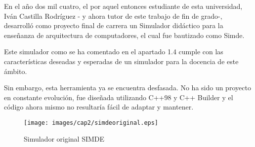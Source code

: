 En el año dos mil cuatro, el por aquel entonces estudiante de esta universidad, 
Iván Castilla Rodríguez - y ahora tutor de este trabajo de fin de grado-, 
desarrolló como proyecto final de carrera un Simulador didáctico para la enseñanza 
de arquitectura de computadores, el cual fue bautizado como Simde. \cite{SIMDE}

\bigskip
Este simulador como se ha comentado en el apartado 1.4 cumple con las características
deseadas y esperadas de un simulador para la docencia de este ámbito.

\bigskip
Sin embargo, esta herramienta ya se encuentra desfasada. No ha sido un proyecto en constante
evolución, fue diseñada utilizando C++98 y C++ Builder y el código ahora mismo no resultaría
fácil de adaptar y mantener.

\begin{figure}[!th]
\begin{center}
\texttt{[image: images/cap2/simdeoriginal.eps]}
\caption{Simulador original SIMDE}
\label{fig:Simulador original SIMDE}
\end{center}
\end{figure}